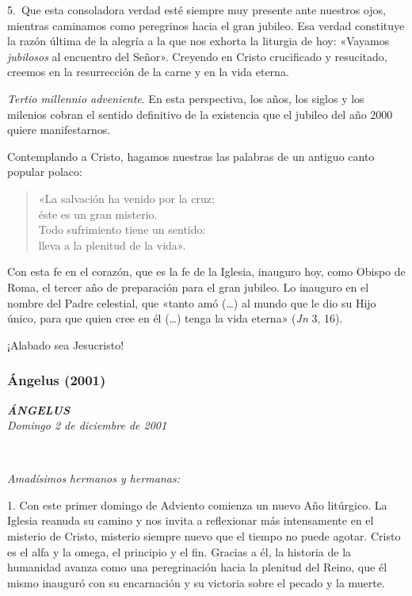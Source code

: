 5.~Que esta consoladora verdad esté siempre muy presente ante nuestros
ojos, mientras caminamos como peregrinos hacia el gran jubileo. Esa
verdad constituye la razón última de la alegría a la que nos exhorta la
liturgia de hoy: «Vayamos \emph{jubilosos} al encuentro del Señor».
Creyendo en Cristo crucificado y resucitado, creemos en la resurrección
de la carne y en la vida eterna.

\emph{Tertio millennio adveniente}. En esta perspectiva, los años, los
siglos y los milenios cobran el sentido definitivo de la existencia que
el jubileo del año 2000 quiere manifestarnos.

Contemplando a Cristo, hagamos nuestras las palabras de un antiguo canto
popular polaco:

\begin{quote}
	«La salvación ha venido por la cruz;\\
	éste es un gran misterio.\\
	Todo sufrimiento tiene un sentido:\\
	lleva a la plenitud de la vida».
\end{quote}

Con esta fe en el corazón, que es la fe de la Iglesia, inauguro hoy,
como Obispo de Roma, el tercer año de preparación para el gran jubileo.
Lo inauguro en el nombre del Padre celestial, que «tanto amó (\ldots{})
al mundo que le dio su Hijo único, para que quien cree en él (\ldots{})
tenga la vida eterna» (\emph{Jn} 3, 16).

¡Alabado sea Jesucristo!

\subsubsection{Ángelus (2001)}
\textbf{\emph{ÁNGELUS\\[2\baselineskip]}}\emph{Domingo 2 de diciembre de
	2001}

~

\emph{Amadísimos hermanos y hermanas:}

1. Con este primer domingo de Adviento comienza un nuevo Año litúrgico.
La Iglesia reanuda su camino y nos invita a reflexionar más intensamente
en el misterio de Cristo, misterio siempre nuevo que el tiempo no puede
agotar. Cristo es el alfa y la omega, el principio y el fin. Gracias a
él, la historia de la humanidad avanza como una peregrinación hacia la
plenitud del Reino, que él mismo inauguró con su encarnación y su
victoria sobre el pecado y la muerte.

